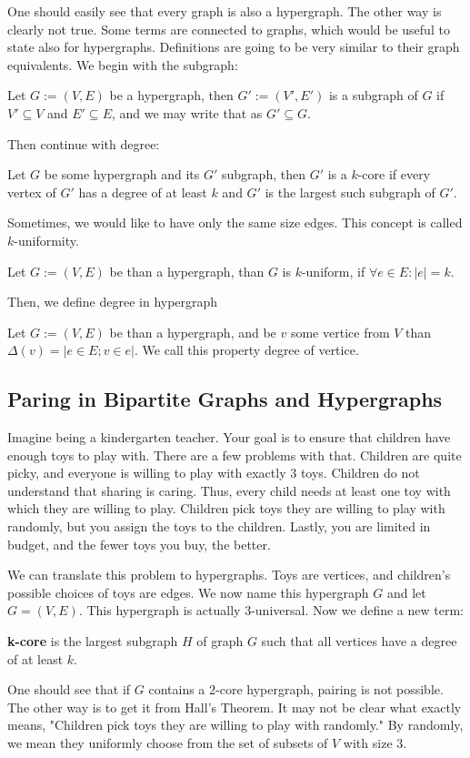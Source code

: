 One should easily see that every graph is also a hypergraph. The other way is clearly not true. Some terms are connected to graphs, which would be useful to state also for hypergraphs. Definitions are going to be very similar to their graph equivalents. We begin with the subgraph:

\begin{defn}
    Let \(G:= (V, E)\) be a hypergraph, then \(G':= (V',E')\) is a subgraph of \(G\) if \(V'\subseteq V\) and \(E' \subseteq E\), and we may write that as \(G' \subseteq G\).
\end{defn}

Then continue with degree:

\begin{defn}
    Let \(G\) be some hypergraph and its \(G'\) subgraph, then \(G'\) is a \(k\)-core if every vertex of \(G'\) has a degree of at least \(k\) and \(G'\) is the largest such subgraph of \(G'\).
\end{defn}

Sometimes, we would like to have only the same size edges. This concept is called $k$-uniformity.
\begin{defn}
    Let \(G:= (V, E)\) be than a hypergraph, than $G$ is $k$-uniform, if $\forall e \in E : |e| = k$.
\end{defn}

Then, we define degree in hypergraph
\begin{defn}
    Let \(G:= (V, E)\) be than a hypergraph, and be $v$ some vertice from $V$ than $\Delta(v) = |{e \in E; v\in e }|$. We call this property degree of vertice.
\end{defn}


\subsection{Paring in Bipartite Graphs and Hypergraphs}
Imagine being a kindergarten teacher. Your goal is to ensure that children have enough toys to play with. There are a few problems with that. Children are quite picky, and everyone is willing to play with exactly 3 toys. Children do not understand that sharing is caring. Thus, every child needs at least one toy with which they are willing to play. Children pick toys they are willing to play with randomly, but you assign the toys to the children. Lastly, you are limited in budget, and the fewer toys you buy, the better.

We can translate this problem to hypergraphs. Toys are vertices, and children's possible choices of toys are edges. We now name this hypergraph $G$ and let $G = (V, E)$. This hypergraph is actually $3$-universal. Now we define a new term:
\begin{defn}
   \textbf{k-core} is the largest subgraph \( H \) of graph \( G \) such that all vertices have a degree of at least \( k \). 
\end{defn}
One should see that if $G$ contains a $2$-core hypergraph, pairing is not possible. The other way is to get it from Hall's Theorem. It may not be clear what exactly means, "Children pick toys they are willing to play with randomly." By randomly, we mean they uniformly choose from the set of subsets of $V$ with size $3$.

